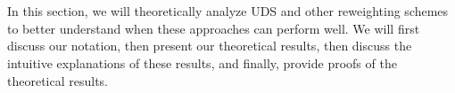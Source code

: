 



\section{}
In this section, we will theoretically analyze UDS and other reweighting schemes to better understand when these approaches can perform well. We will first discuss our notation, then present our theoretical results, then discuss the intuitive explanations of these results, and finally, provide proofs of the theoretical results.

